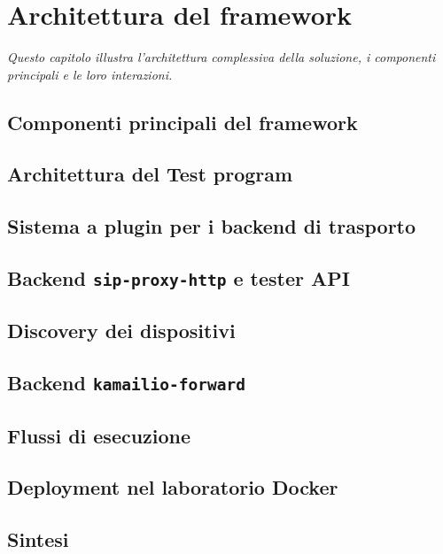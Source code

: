 \chapter{Architettura del framework}
\begin{minipage}{12cm}\textit{Questo capitolo illustra l'architettura complessiva della soluzione, i componenti principali e le loro interazioni.}
\end{minipage}
\vspace*{1cm}

\section{Componenti principali del framework}

\section{Architettura del Test program}

\section{Sistema a plugin per i backend di trasporto}

\section{Backend \texttt{sip-proxy-http} e tester API}

\section{Discovery dei dispositivi}

\section{Backend \texttt{kamailio-forward}}

\section{Flussi di esecuzione}

\section{Deployment nel laboratorio Docker}

\section{Sintesi}
